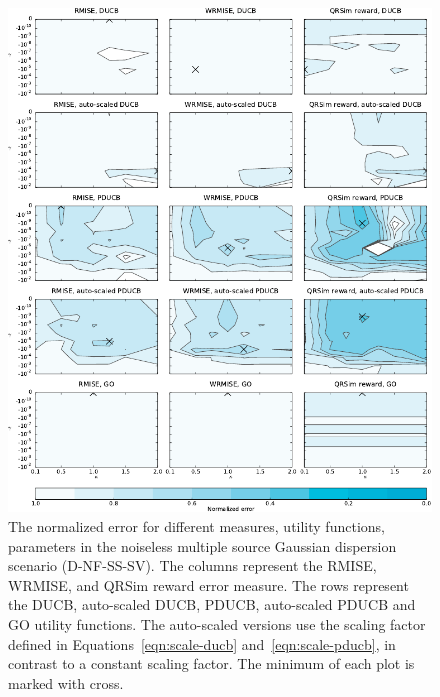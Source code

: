 \begin{figure}
    \centering
    \includegraphics{plots/psearch-D-NF-MS-SV}
    \caption[Normalized error (D-NF-MS-SV)]{The normalized error for different 
        measures, utility functions, parameters in the noiseless multiple source 
        Gaussian dispersion scenario (D-NF-SS-SV).  The columns represent the 
        RMISE, WRMISE, and QRSim reward error measure.  The rows represent the 
        DUCB, auto-scaled DUCB, PDUCB, auto-scaled PDUCB and GO utility 
        functions. The auto-scaled versions use the scaling factor defined in 
        Equations~\ref{eqn:scale-ducb} and~\ref{eqn:scale-pducb}, in contrast to 
        a constant scaling factor.  The minimum of each plot is marked with 
        cross.}\label{fig:psearch-D-NF-MS-SV}
\end{figure}

\newenvironment{errtbl}{\begin{tabular}{lllSSSS}\toprule}{\bottomrule\end{tabular}}
\newcommand*{\errtblhead}[1]{
        & & &
        \multicolumn{2}{c}{#1} &
        \multicolumn{2}{c}{Norm.\ #1} \\
        \cmidrule(lr){4-5} \cmidrule(lr){6-7}

        Utility function &
        \multicolumn{1}{l}{$\kappa$} &
        \multicolumn{1}{l}{$\gamma$} &
        \multicolumn{1}{c}{Mean} &
        \multicolumn{1}{c}{Std} &
        \multicolumn{1}{c}{Mean} &
        \multicolumn{1}{c}{Std} \\
        & & &
        \multicolumn{1}{c}{\si{\nano\gram\per\meter\cubed}} &
        \multicolumn{1}{c}{\si{\nano\gram\per\meter\cubed}} &
        & \\ \midrule }


